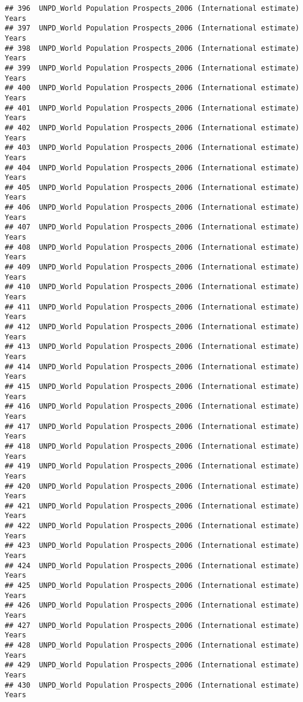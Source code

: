 \documentclass[]{article}
\begin{document}
\begin{verbatim}
## 396  UNPD_World Population Prospects_2006 (International estimate) Years
## 397  UNPD_World Population Prospects_2006 (International estimate) Years
## 398  UNPD_World Population Prospects_2006 (International estimate) Years
## 399  UNPD_World Population Prospects_2006 (International estimate) Years
## 400  UNPD_World Population Prospects_2006 (International estimate) Years
## 401  UNPD_World Population Prospects_2006 (International estimate) Years
## 402  UNPD_World Population Prospects_2006 (International estimate) Years
## 403  UNPD_World Population Prospects_2006 (International estimate) Years
## 404  UNPD_World Population Prospects_2006 (International estimate) Years
## 405  UNPD_World Population Prospects_2006 (International estimate) Years
## 406  UNPD_World Population Prospects_2006 (International estimate) Years
## 407  UNPD_World Population Prospects_2006 (International estimate) Years
## 408  UNPD_World Population Prospects_2006 (International estimate) Years
## 409  UNPD_World Population Prospects_2006 (International estimate) Years
## 410  UNPD_World Population Prospects_2006 (International estimate) Years
## 411  UNPD_World Population Prospects_2006 (International estimate) Years
## 412  UNPD_World Population Prospects_2006 (International estimate) Years
## 413  UNPD_World Population Prospects_2006 (International estimate) Years
## 414  UNPD_World Population Prospects_2006 (International estimate) Years
## 415  UNPD_World Population Prospects_2006 (International estimate) Years
## 416  UNPD_World Population Prospects_2006 (International estimate) Years
## 417  UNPD_World Population Prospects_2006 (International estimate) Years
## 418  UNPD_World Population Prospects_2006 (International estimate) Years
## 419  UNPD_World Population Prospects_2006 (International estimate) Years
## 420  UNPD_World Population Prospects_2006 (International estimate) Years
## 421  UNPD_World Population Prospects_2006 (International estimate) Years
## 422  UNPD_World Population Prospects_2006 (International estimate) Years
## 423  UNPD_World Population Prospects_2006 (International estimate) Years
## 424  UNPD_World Population Prospects_2006 (International estimate) Years
## 425  UNPD_World Population Prospects_2006 (International estimate) Years
## 426  UNPD_World Population Prospects_2006 (International estimate) Years
## 427  UNPD_World Population Prospects_2006 (International estimate) Years
## 428  UNPD_World Population Prospects_2006 (International estimate) Years
## 429  UNPD_World Population Prospects_2006 (International estimate) Years
## 430  UNPD_World Population Prospects_2006 (International estimate) Years

\end{verbatim}
\end{document}
